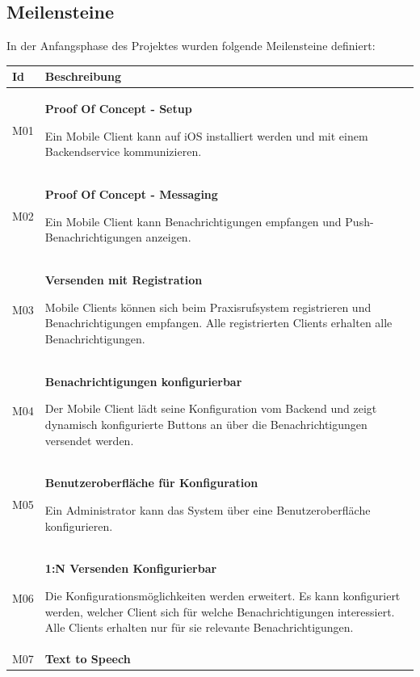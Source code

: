 \clearpage
\subsection{Meilensteine}

In der Anfangsphase des Projektes wurden folgende Meilensteine definiert:

\begin{table}[h]
    \centering
    \begin{tabular}{|l|p{15cm}|}
        \hline
        \textbf{Id} & \textbf{Beschreibung}                                                                                                                                                                                         \\
        \hline
        M01         & \textbf{Proof Of Concept - Setup}

        Ein Mobile Client kann auf iOS installiert werden und mit einem Backendservice kommunizieren. \\
        \hline
        M02         & \textbf{Proof Of Concept - Messaging}

        Ein Mobile Client kann Benachrichtigungen empfangen und Push-Benachrichtigungen anzeigen. \\
        \hline
        M03         & \textbf{Versenden mit Registration}

        Mobile Clients können sich beim Praxisrufsystem registrieren und Benachrichtigungen empfangen.
        Alle registrierten Clients erhalten alle Benachrichtigungen. \\
        \hline
        M04         & \textbf{Benachrichtigungen konfigurierbar}

        Der Mobile Client lädt seine Konfiguration vom Backend und zeigt dynamisch konfigurierte Buttons an über die Benachrichtigungen versendet werden.\\
        \hline
        M05         & \textbf{Benutzeroberfläche für Konfiguration}

        Ein Administrator kann das System über eine Benutzeroberfläche konfigurieren. \\
        \hline
        M06         & \textbf{1:N Versenden Konfigurierbar}

        Die Konfigurationsmöglichkeiten werden erweitert.
        Es kann konfiguriert werden, welcher Client sich für welche Benachrichtigungen interessiert.
        Alle Clients erhalten nur für sie relevante Benachrichtigungen.  \\
        \hline
        M07         & \textbf{Text to Speech}


\end{tabular}
\end{table}
